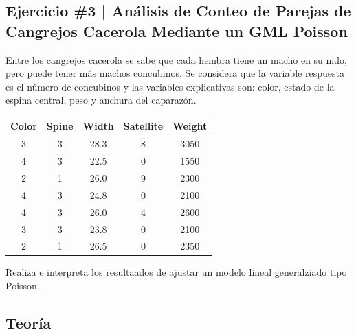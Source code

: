 \newpage

\begin{myblock}
\section*{Ejercicio \#3 | Análisis de Conteo de Parejas de Cangrejos Cacerola Mediante un GML Poisson}

Entre los cangrejos cacerola se sabe que cada hembra tiene un macho en su nido, pero puede tener más 
machos concubinos. Se considera que la variable respuesta es el número de concubinos y las variables
explicativas son: color, estado de la espina central, peso y anchura del caparazón.\\

\begin{center}
\begin{tabular}{ccccc}
\hline
\textbf{Color} & \textbf{Spine} & \textbf{Width} & \textbf{Satellite} & \textbf{Weight} \\
\hline
3 & 3 & 28.3 & 8 & 3050 \\
4 & 3 & 22.5 & 0 & 1550 \\
2 & 1 & 26.0 & 9 & 2300 \\
4 & 3 & 24.8 & 0 & 2100 \\
4 & 3 & 26.0 & 4 & 2600 \\
3 & 3 & 23.8 & 0 & 2100 \\
2 & 1 & 26.5 & 0 & 2350 \\
\hline
\end{tabular}
\end{center}

Realiza e interpreta los resultaados de ajustar un modelo lineal generalziado tipo Poisson. 

\end{myblock}



\subsection{Teoría}

